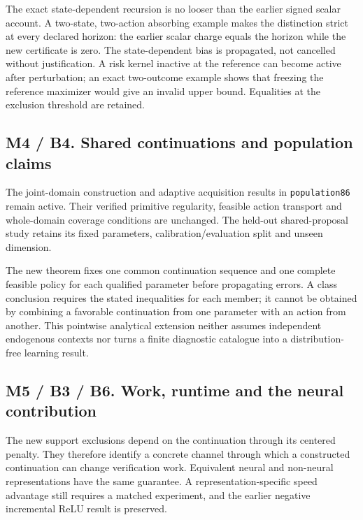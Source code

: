 The exact state-dependent recursion is no looser than the earlier signed
scalar account. A two-state, two-action absorbing example makes the
distinction strict at every declared horizon: the earlier scalar charge
equals the horizon while the new certificate is zero. The
state-dependent bias is propagated, not cancelled without justification.
A risk kernel inactive at the reference can become active after
perturbation; an exact two-outcome example shows that freezing the
reference maximizer would give an invalid upper bound. Equalities at the
exclusion threshold are retained.

\hypertarget{m4-b4.-shared-continuations-and-population-claims}{%
\subsection{M4 / B4. Shared continuations and population
claims}\label{m4-b4.-shared-continuations-and-population-claims}}

The joint-domain construction and adaptive acquisition results in
\texttt{population86} remain active. Their verified primitive
regularity, feasible action transport and whole-domain coverage
conditions are unchanged. The held-out shared-proposal study retains its
fixed parameters, calibration/evaluation split and unseen dimension.

The new theorem fixes one common continuation sequence and one complete
feasible policy for each qualified parameter before propagating errors.
A class conclusion requires the stated inequalities for each member; it
cannot be obtained by combining a favorable continuation from one
parameter with an action from another. This pointwise analytical
extension neither assumes independent endogenous contexts nor turns a
finite diagnostic catalogue into a distribution-free learning result.

\hypertarget{m5-b3-b6.-work-runtime-and-the-neural-contribution}{%
\subsection{M5 / B3 / B6. Work, runtime and the neural
contribution}\label{m5-b3-b6.-work-runtime-and-the-neural-contribution}}

The new support exclusions depend on the continuation through its
centered penalty. They therefore identify a concrete channel through
which a constructed continuation can change verification work.
Equivalent neural and non-neural representations have the same
guarantee. A representation-specific speed advantage still requires a
matched experiment, and the earlier negative incremental ReLU result is
preserved.

